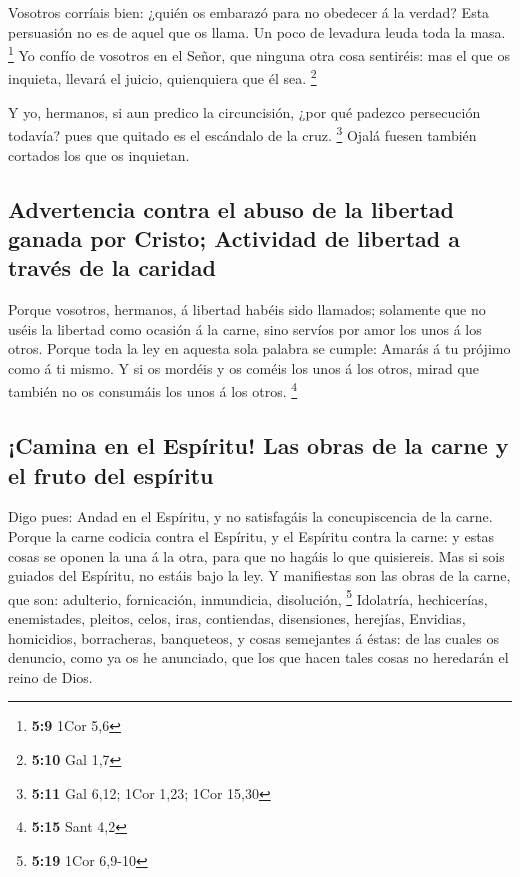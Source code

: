  Vosotros corríais bien: ¿quién os embarazó para no obedecer
á la verdad?  Esta persuasión no es de aquel que os llama.
 Un poco de levadura leuda toda la masa. \footnote{\textbf{5:9}
  1Cor 5,6}  Yo confío de vosotros en el Señor, que ninguna
otra cosa sentiréis: mas el que os inquieta, llevará el juicio,
quienquiera que él sea. \footnote{\textbf{5:10} Gal 1,7}

 Y yo, hermanos, si aun predico la circuncisión, ¿por qué
padezco persecución todavía? pues que quitado es el escándalo de la
cruz. \footnote{\textbf{5:11} Gal 6,12; 1Cor 1,23; 1Cor 15,30}
 Ojalá fuesen también cortados los que os inquietan.

\hypertarget{advertencia-contra-el-abuso-de-la-libertad-ganada-por-cristo-actividad-de-libertad-a-travuxe9s-de-la-caridad}{%
\subsection{Advertencia contra el abuso de la libertad ganada por
Cristo; Actividad de libertad a través de la
caridad}\label{advertencia-contra-el-abuso-de-la-libertad-ganada-por-cristo-actividad-de-libertad-a-travuxe9s-de-la-caridad}}

 Porque vosotros, hermanos, á libertad habéis sido
llamados; solamente que no uséis la libertad como ocasión á la carne,
sino servíos por amor los unos á los otros.  Porque toda la
ley en aquesta sola palabra se cumple: Amarás á tu prójimo como á ti
mismo.  Y si os mordéis y os coméis los unos á los otros,
mirad que también no os consumáis los unos á los otros. \footnote{\textbf{5:15}
  Sant 4,2}

\hypertarget{camina-en-el-espuxedritu-las-obras-de-la-carne-y-el-fruto-del-espuxedritu}{%
\subsection{¡Camina en el Espíritu! Las obras de la carne y el fruto del
espíritu}\label{camina-en-el-espuxedritu-las-obras-de-la-carne-y-el-fruto-del-espuxedritu}}

 Digo pues: Andad en el Espíritu, y no satisfagáis la
concupiscencia de la carne.  Porque la carne codicia contra
el Espíritu, y el Espíritu contra la carne: y estas cosas se oponen la
una á la otra, para que no hagáis lo que quisiereis.  Mas
si sois guiados del Espíritu, no estáis bajo la ley.  Y
manifiestas son las obras de la carne, que son: adulterio, fornicación,
inmundicia, disolución, \footnote{\textbf{5:19} 1Cor 6,9-10}
 Idolatría, hechicerías, enemistades, pleitos, celos, iras,
contiendas, disensiones, herejías,  Envidias, homicidios,
borracheras, banqueteos, y cosas semejantes á éstas: de las cuales os
denuncio, como ya os he anunciado, que los que hacen tales cosas no
heredarán el reino de Dios.

